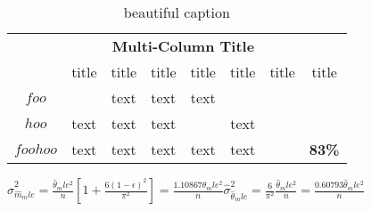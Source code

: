 \documentclass[12pt]{article}
\begin{document}
\begin{table}[H]
\small
\centering
\caption{beautiful caption }
\label{table:put-here}
\begin{tabular}{|c|c|c|c|c|c|c|c|} %
\cline{2-7} 						%
\multicolumn{1}{c|}{} & \multicolumn{6}{c|}{\textbf{Multi-Column Title}} & \multicolumn{1}{c}{}\\
\cline{2-8} 						
\multicolumn{1}{c|}{} & title & title & title & title & title & title & title\\
\hline 
$foo$ &  & text & text & text &  &  & \\
$hoo$ & text & text & text &  & text &  & \\
\hline
\textbf{$foohoo$} & text & text & text & text & text &  & \textbf{83\%}\\
\hline 
\end{tabular}
\end{table}


$\hat{\sigma}_{\hat{m}_mle}^2 = \frac{\hat{\theta}_mle^2}{n} [1 + \frac{6(1 - \epsilon)^2}{\pi^2}] = \frac{1.10867 \hat{\theta}_mle^2}{n} \hat{\sigma}_{\hat{\theta}_mle}^2 = \frac{6}{\pi^2} \frac{\hat{\theta}_mle^2}{n} = \frac{0.60793 \hat{\theta}_mle^2}{n}
$
\end{document}
